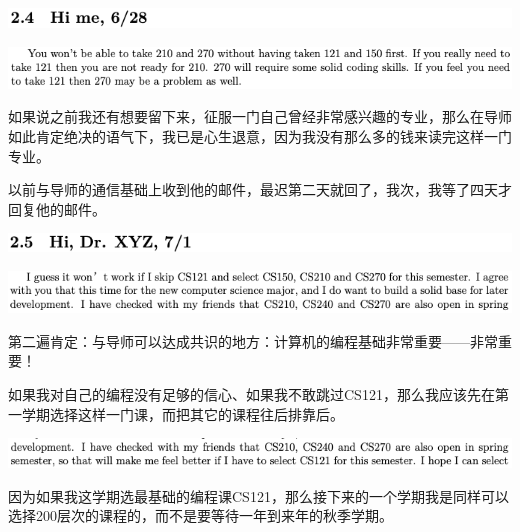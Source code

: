 \documentclass[9pt, b5paper]{article}
\begin{document}
\begin{center}
\includegraphics[width=.9\linewidth]{./pic/backups_plans_20210421_090244.png}
\end{center}

\begin{center}
\includegraphics[width=.9\linewidth]{./pic/backups_plans_20210419_085322.png}
\end{center}

如果说之前我还有想要留下来，征服一门自己曾经非常感兴趣的专业，那么在导师如此肯定绝决的语气下，我已是心生退意，因为我没有那么多的钱来读完这样一门专业。

以前与导师的通信基础上收到他的邮件，最迟第二天就回了，我次，我等了四天才回复他的邮件。 

\begin{center}
\includegraphics[width=.9\linewidth]{./pic/backups_plans_20210421_090714.png}
\end{center}

\begin{center}
\includegraphics[width=.9\linewidth]{./pic/backups_plans_20210421_091059.png}
\end{center}

第二遍肯定：与导师可以达成共识的地方：计算机的编程基础非常重要——非常重要！

如果我对自己的编程没有足够的信心、如果我不敢跳过CS121，那么我应该先在第一学期选择这样一门课，而把其它的课程往后排靠后。

\begin{center}
\includegraphics[width=.9\linewidth]{./pic/backups_plans_20210421_091227.png}
\end{center}

因为如果我这学期选最基础的编程课CS121，那么接下来的一个学期我是同样可以选择200层次的课程的，而不是要等待一年到来年的秋季学期。
\end{document}
